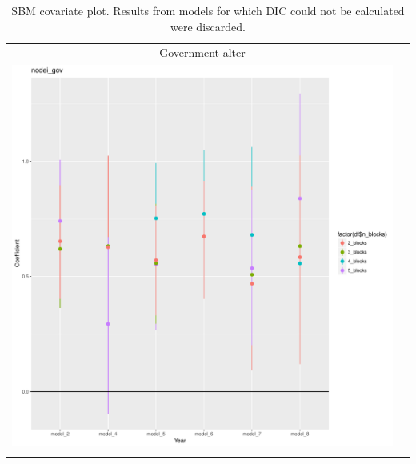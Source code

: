 \documentclass[fleqn,12pt]{wlscirep}
\begin{document}
\clearpage
\begin{longtable}[!h]{c@{\hskip 0cm}c}
Government alter \\
\includegraphics[height=.75\textheight, clip=true, trim=.5cm .5cm 0cm .6cm]{figures/rl_plots2/nodei_gov.pdf}   \\
\caption{\label{fig:SBM_plot_gov} SBM covariate plot. Results from models for which DIC could not be calculated were discarded.}
\end{longtable}
\end{document}
